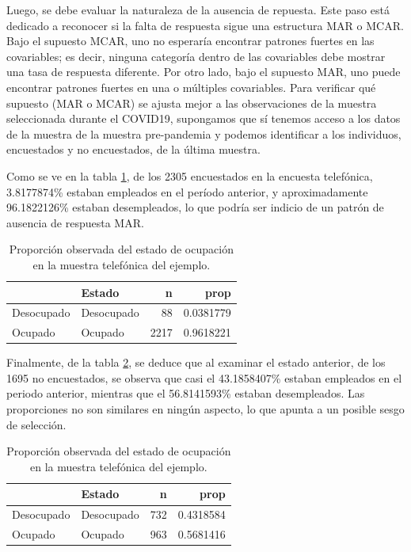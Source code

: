 \documentclass[
  12pt,
]{book}
\begin{document}
Luego, se debe evaluar la naturaleza de la ausencia de repuesta. Este paso está dedicado a reconocer si la falta de respuesta sigue una estructura MAR o MCAR. Bajo el supuesto MCAR, uno no esperaría encontrar patrones fuertes en las covariables; es decir, ninguna categoría dentro de las covariables debe mostrar una tasa de respuesta diferente. Por otro lado, bajo el supuesto MAR, uno puede encontrar patrones fuertes en una o múltiples covariables. Para verificar qué supuesto (MAR o MCAR) se ajusta mejor a las observaciones de la muestra seleccionada durante el COVID19, supongamos que sí tenemos acceso a los datos de la muestra de la muestra pre-pandemia y podemos identificar a los individuos, encuestados y no encuestados, de la última muestra.

Como se ve en la tabla \ref{tab:tabsesgo7}, de los 2305 encuestados en la encuesta telefónica, 3.8177874\% estaban empleados en el período anterior, y aproximadamente 96.1822126\% estaban desempleados, lo que podría ser indicio de un patrón de ausencia de respuesta MAR.

\begin{table}

\caption{\label{tab:tabsesgo7}Proporción observada del estado de ocupación en la muestra telefónica del ejemplo. }
\centering
\begin{tabular}[t]{l|l|r|r}
\hline
  & Estado & n & prop\\
\hline
Desocupado & Desocupado & 88 & 0.0381779\\
\hline
Ocupado & Ocupado & 2217 & 0.9618221\\
\hline
\end{tabular}
\end{table}

Finalmente, de la tabla \ref{tab:tabsesgo8}, se deduce que al examinar el estado anterior, de los 1695 no encuestados, se observa que casi el 43.1858407\% estaban empleados en el periodo anterior, mientras que el 56.8141593\% estaban desempleados. Las proporciones no son similares en ningún aspecto, lo que apunta a un posible sesgo de selección.

\begin{table}

\caption{\label{tab:tabsesgo8}Proporción observada del estado de ocupación en la muestra telefónica del ejemplo.}
\centering
\begin{tabular}[t]{l|l|r|r}
\hline
  & Estado & n & prop\\
\hline
Desocupado & Desocupado & 732 & 0.4318584\\
\hline
Ocupado & Ocupado & 963 & 0.5681416\\
\hline
\end{tabular}
\end{table}
\end{document}
